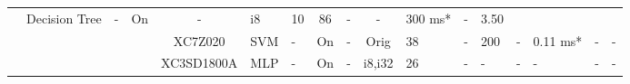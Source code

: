 \documentclass{article}
\begin{document}
\begin{table}
\begin{adjustbox}{totalheight=\baselineskip,}
\begin{tabular}{ccccclp{2em}cp{3em}cp{2em}p{4em}p{3em}p{3.5em}p{3.5em}p{2.5em}p{3em}}
                   &\multirow{1}{*}{Decision Tree}
                       &\multirow{1}{*}{-}
                           &\multirow{1}{*}{On}
                               &\multirow{1}{*}{-}
                                   &\multirow{1}{*}{i8}
                                       &\multirow{1}{*}{10}
                                           &\multirow{1}{*}{86}
                                               &\multirow{1}{*}{-}
                                                   &\multirow{1}{*}{-}
                                                       &\multirow{1}{*}{300 ms*}
                                                           &\multirow{1}{*}{-}
                                                               &\multirow{1}{*}{3.50}\\
\cmidrule{4-17}
   &   &   &\multirow{1}{*}{\cite{martinsRealtimeSVMbasedHardware2024}}
               &\multirow{1}{*}{XC7Z020}
                   &\multirow{1}{*}{SVM}
                       &\multirow{1}{*}{-}
                           &\multirow{1}{*}{On}
                               &\multirow{1}{*}{-}
                                   &\multirow{1}{*}{Orig}
                                       &\multirow{1}{*}{38}
                                           &\multirow{1}{*}{-}
                                               &\multirow{1}{*}{200}
                                                   &\multirow{1}{*}{-}
                                                       &\multirow{1}{*}{0.11 ms*}
                                                           &\multirow{1}{*}{-}
                                                               &\multirow{1}{*}{-}\\
\cmidrule{4-17}
   &   &   &\multirow{1}{*}{\cite{matos-carvalhoStaticDynamicAlgorithms2019}}
               &\multirow{1}{*}{XC3SD1800A}
                   &\multirow{1}{*}{MLP}
                       &\multirow{1}{*}{-}
                           &\multirow{1}{*}{On}
                               &\multirow{1}{*}{-}
                                   &\multirow{1}{*}{i8,i32}
                                       &\multirow{1}{*}{26}
                                           &\multirow{1}{*}{-}
                                               &\multirow{1}{*}{-}
                                                   &\multirow{1}{*}{-}
                                                       &\multirow{1}{*}{-}
                                                           &\multirow{1}{*}{-}
                                                               &\multirow{1}{*}{-}\\

\end{tabular}
\end{adjustbox}
\end{table}
\end{document}

